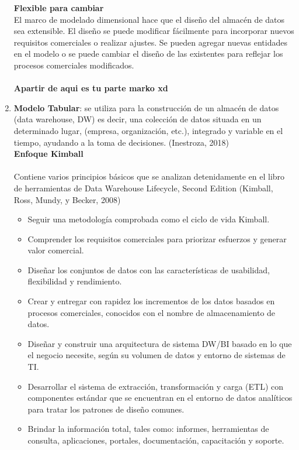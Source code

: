 \documentclass[twoside,twocolumn]{article}
\begin{document}
\begin{enumerate}
\textbf{Flexible para cambiar}\\
El marco de modelado dimensional hace que el diseño del almacén de datos sea extensible. El diseño se puede modificar fácilmente para incorporar nuevos requisitos comerciales o realizar ajustes. Se pueden agregar nuevas entidades en el modelo o se puede cambiar el diseño de las existentes para reflejar los procesos comerciales modificados.
\textbf{}\\
\textbf{}\\
\textbf{Apartir de aqui es tu parte marko xd}\\
\item \textbf{ Modelo Tabular}: se utiliza para la construcción de un almacén de datos (data warehouse, DW) es decir, una colección de datos situada en un determinado lugar, (empresa, organización, etc.), integrado y variable en el tiempo, ayudando a la toma de decisiones. (Inestroza, 2018) \\

\textbf{Enfoque Kimball}
\\ \\
Contiene varios principios básicos que se analizan detenidamente en el libro de herramientas de Data Warehouse Lifecycle, Second Edition (Kimball, Ross, Mundy, y Becker, 2008)
\begin{itemize}
\item Seguir una metodología comprobada como el  ciclo de vida Kimball.
\item Comprender los requisitos comerciales para priorizar esfuerzos y generar valor comercial. 
\item Diseñar los conjuntos de datos con las características de usabilidad, flexibilidad y rendimiento.
\item Crear y entregar con rapidez los incrementos de los datos basados en procesos comerciales, conocidos con el nombre de almacenamiento de datos. 
\item Diseñar y construir una arquitectura de sistema DW/BI basado en lo que el negocio necesite, según su volumen de datos y entorno de sistemas de TI. 
\item Desarrollar el sistema de extracción, transformación y carga (ETL) con componentes estándar que se encuentran en el entorno de datos analíticos para tratar los patrones de diseño comunes.
\item Brindar la información total, tales como: informes, herramientas de consulta, aplicaciones, portales, documentación, capacitación y soporte.
\end{itemize}




\end{enumerate}
\end{document}
